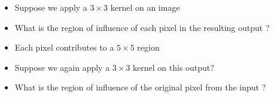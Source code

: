 \begin{frame}
\end{frame}


\begin{frame}
	\hspace{1cm}
	\begin{columns}
		\vspace{0.2cm}
		
		\begin{overlayarea}{\textwidth}{\textheight} 
			\begin{center}
               		
			\end{center}
		\end{overlayarea}   
		\vspace{1cm}
		\begin{overlayarea}{\textwidth}{\textheight} 
			\begin{itemize}
				\justifying
				\item<1-> Suppose we apply a $3 \times 3$ kernel on an image
				\item<2-> What is the region of influence of each pixel in the resulting output ?
				\item<3-> Each pixel contributes to a $5 \times 5$ region
				\item<4-> Suppose we again apply a $3 \times 3$ kernel on this output? 
				\item<5-> What is the region of influence of the original pixel from the input ? \onslide<7->{(a $7 \times 7$ region)}
			\end{itemize}
		\end{overlayarea}    
		
	\end{columns}
	
\end{frame}


\begin{frame}
	\noindent
	       
	       
\end{frame}



